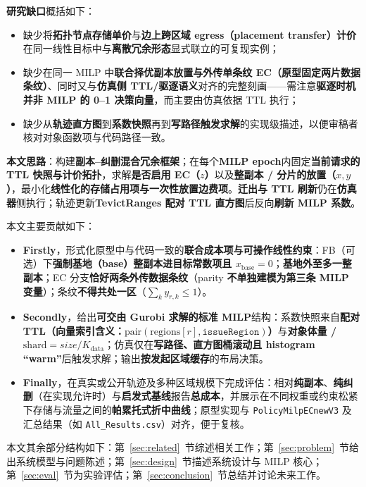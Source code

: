 \documentclass[conference]{IEEEtran}
\begin{document}
\textbf{研究缺口}概括如下：
\begin{itemize}
\item 缺少将\textbf{拓扑节点存储单价}与\textbf{边上跨区域 egress（placement transfer）计价}在同一线性目标中与\textbf{离散冗余形态}显式联立的可复现实例；
\item 缺少在同一 MILP 中\textbf{联合择优副本放置与外传单条纹 EC（原型固定两片数据条纹）}、同时又与\textbf{仿真侧 TTL/驱逐语义}对齐的完整刻画——需注意\textbf{驱逐时机并非 MILP 的 0--1 决策向量}，而主要由仿真依据 TTL 执行；
\item 缺少从\textbf{轨迹直方图}到\textbf{系数快照}再到\textbf{写路径触发求解}的实现级描述，以便审稿者核对对象函数项与代码路径一致。
\end{itemize}

\textbf{本文思路}：构建\textbf{副本--纠删混合冗余框架}；在每个\textbf{MILP  epoch}内固定\textbf{当前请求的 TTL 快照与计价拓扑}，求解\textbf{是否启用 EC（$z$）}以及\textbf{整副本 / 分片的放置（$x,y$）}，最小化\textbf{线性化的存储占用项与一次性放置边费项}。\textbf{迁出与 TTL 刷新}仍在\textbf{仿真器}侧执行；轨迹更新\textbf{TevictRanges 配对 TTL 直方图}后反向\textbf{刷新 MILP 系数}。

本文主要贡献如下：
\begin{itemize}
\item \textbf{Firstly}，形式化原型中与代码一致的\textbf{联合成本项与可操作线性约束}：FB（可选）下\textbf{强制基地（base）整副本进目标常数项且 $x_{\mathrm{base}}{=}0$}；\textbf{基地外至多一整副本}；EC 分支\textbf{恰好两条外传数据条纹}（parity \textbf{不单独建模为第三条 MILP 变量}）；条纹\textbf{不得共处一区}（$\sum_k y_{r,k}{\leq}1$）。
\item \textbf{Secondly}，给出\textbf{可交由 Gurobi 求解的标准 MILP}结构：系数快照来自\textbf{配对 TTL（向量索引含义：$\mathrm{pair}(\mathrm{regions}[r],\texttt{issueRegion})$）}与\textbf{对象体量 / $\mathrm{shard}=size/K_{\mathrm{data}}$}；仿真仅在\textbf{写路径、直方图桶滚动且 histogram ``warm''}后触发求解；输出\textbf{按发起区域缓存}的布局决策。
\item \textbf{Finally}，在真实或公开轨迹及多种区域规模下完成评估：相对\textbf{纯副本}、\textbf{纯纠删}（在实现允许时）与\textbf{启发式基线}报告\textbf{总成本}，并展示在不同权重或约束松紧下存储与流量之间的\textbf{帕累托式折中曲线}；原型实现与 \texttt{PolicyMilpECnewV3} 及汇总结果（如 \texttt{All\_Results.csv}）对齐，便于复核。
\end{itemize}

本文其余部分结构如下：第~\ref{sec:related}~节综述相关工作；第~\ref{sec:problem}~节给出系统模型与问题陈述；第~\ref{sec:design}~节描述系统设计与 MILP 核心；第~\ref{sec:eval}~节为实验评估；第~\ref{sec:conclusion}~节总结并讨论未来工作。
\end{document}
